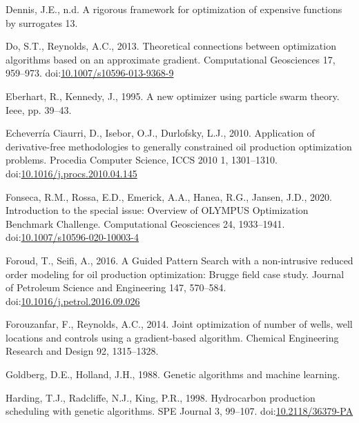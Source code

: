 \documentclass[]{elsarticle} %
\newlength{\cslhangindent}
\newenvironment{CSLReferences}[2] %
 {%
  \setlength{\parindent}{0pt}
  \ifodd #1 \everypar{\setlength{\hangindent}{\cslhangindent}}\ignorespaces\fi
  \ifnum #2 > 0
  \setlength{\parskip}{#2\baselineskip}
  \fi
 }%
 {}
\begin{document}
\begin{CSLReferences}{1}{0}
\leavevmode{}%
Dennis, J.E., n.d. A rigorous framework for optimization of expensive functions by surrogates 13.

\leavevmode{}%
Do, S.T., Reynolds, A.C., 2013. Theoretical connections between optimization algorithms based on an approximate gradient. Computational Geosciences 17, 959--973. doi:\href{https://doi.org/10.1007/s10596-013-9368-9}{10.1007/s10596-013-9368-9}

\leavevmode{}%
Eberhart, R., Kennedy, J., 1995. A new optimizer using particle swarm theory. Ieee, pp. 39--43.

\leavevmode{}%
Echeverría Ciaurri, D., Isebor, O.J., Durlofsky, L.J., 2010. Application of derivative-free methodologies to generally constrained oil production optimization problems. Procedia Computer Science, ICCS 2010 1, 1301--1310. doi:\href{https://doi.org/10.1016/j.procs.2010.04.145}{10.1016/j.procs.2010.04.145}

\leavevmode{}%
Fonseca, R.M., Rossa, E.D., Emerick, A.A., Hanea, R.G., Jansen, J.D., 2020. Introduction to the special issue: Overview of OLYMPUS Optimization Benchmark Challenge. Computational Geosciences 24, 1933--1941. doi:\href{https://doi.org/10.1007/s10596-020-10003-4}{10.1007/s10596-020-10003-4}

\leavevmode{}%
Foroud, T., Seifi, A., 2016. A Guided Pattern Search with a non-intrusive reduced order modeling for oil production optimization: Brugge field case study. Journal of Petroleum Science and Engineering 147, 570--584. doi:\href{https://doi.org/10.1016/j.petrol.2016.09.026}{10.1016/j.petrol.2016.09.026}

\leavevmode{}%
Forouzanfar, F., Reynolds, A.C., 2014. Joint optimization of number of wells, well locations and controls using a gradient-based algorithm. Chemical Engineering Research and Design 92, 1315--1328.

\leavevmode{}%
Goldberg, D.E., Holland, J.H., 1988. Genetic algorithms and machine learning.

\leavevmode{}%
Harding, T.J., Radcliffe, N.J., King, P.R., 1998. Hydrocarbon production scheduling with genetic algorithms. SPE Journal 3, 99--107. doi:\href{https://doi.org/10.2118/36379-PA}{10.2118/36379-PA}


\end{CSLReferences}
\end{document}
